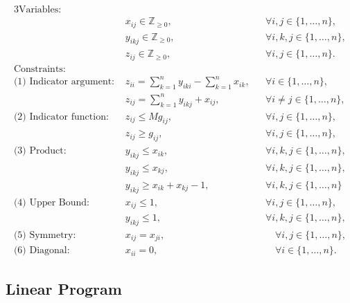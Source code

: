 \documentclass[11pt]{article}
\begin{document}
\begin{alignat}{3}
\text{Variables: } & \nonumber \\ 
& x_{ij} \in \mathbb{Z}_{\geq 0}, 
&& \forall i,j \in \{1, \dots, n\}, \label{eq::IP_x_variable} \\ 
& y_{ikj} \in \mathbb{Z}_{\geq 0}, 
&& \forall i,k,j \in \{1, \dots, n\}, \label{eq::IP_y_variable} \\
& z_{ij} \in \mathbb{Z}_{\geq 0}, 
&& \forall i,j \in \{1, \dots, n\}. \label{eq::IP_z_variable} \\
\text{Constraints: } & \nonumber \\
\text{(1) Indicator argument: } 
& z_{ii} = \sum_{k = 1}^{n}y_{iki} - \sum_{k = 1}^{n} x_{ik}, 
&& \forall i \in \{1, \dots, n\} , \label{eq::IP_fund_matrix} \\
& z_{ij} = \sum_{k = 1}^{n}y_{ikj} + x_{ij}, 
&& \forall i \neq j \in \{1, \dots, n\} , \label{eq::IP_indicator_arg} \\
\text{(2) Indicator function: } 
& z_{ij} \leq M g_{ij}, 
&& \forall i, j \in \{1, \dots, n\}, \label{eq::IP_indicator_upper} \\
& z_{ij} \geq g_{ij}, 
&& \forall i, j \in \{1, \dots, n\}, \label{eq::IP_indicator_lower}\\
\text{(3) Product: } 
& y_{ikj} \leq x_{ik}, 
&& \forall i, k, j \in \{1, \dots, n\}, \label{eq::IP_product_upper_first} \\
& y_{ikj} \leq x_{kj}, 
&& \forall i, k, j \in \{1, \dots, n\}, \label{eq::IP_product_upper_second} \\
& y_{ikj} \geq x_{ik} + x_{kj} - 1, 
&& \forall i, k, j \in \{1, \dots, n\} \label{eq::IP_product_lower} \\
\text{(4) Upper Bound: } 
& x_{ij} \leq 1, 
&& \forall i, j \in \{1, \dots, n\}, \label{eq::IP_x_upper_bound} \\
& y_{ikj} \leq 1, 
&& \forall i, k, j \in \{1, \dots, n\}, \label{eq::IP_y_upper_bound} \\
\text{(5) Symmetry: } 
& x_{ij} = x_{ji}, 
&&\quad \forall i,j \in \{1, \dots, n\}, \label{eq::IP_symmetry_x} \\
\text{(6) Diagonal: } 
& x_{ii} = 0, 
&&\quad \forall i \in \{1, \dots, n\}.  \label{eq::IP_diagonal_x} 
\end{alignat} \label{eq::integer_program}

\subsection{Linear Program} \label{subsec::linear_program}
\end{document}
